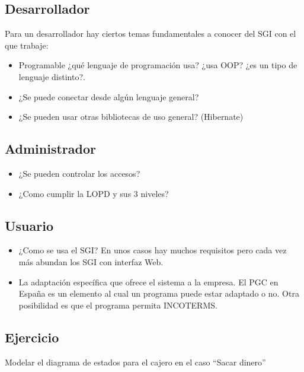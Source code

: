 \documentclass[letterpaper,10pt,spanish]{sphinxmanual}
\begin{document}
\subsection{Desarrollador}
\label{tema8:desarrollador}
Para un desarrollador hay ciertos temas fundamentales a conocer del SGI con el que trabaje:
\begin{itemize}
\item {} 
Programable ¿qué lenguaje de programación usa? ¿usa OOP? ¿es un tipo de lenguaje distinto?.

\item {} 
¿Se puede conectar desde algún lenguaje general?

\item {} 
¿Se pueden usar otras bibliotecas de uso general? (Hibernate)

\end{itemize}


\subsection{Administrador}
\label{tema8:administrador}\begin{itemize}
\item {} 
¿Se pueden controlar  los accesos?

\item {} 
¿Como cumplir la LOPD y sus 3 niveles?

\end{itemize}


\subsection{Usuario}
\label{tema8:usuario}\begin{itemize}
\item {} 
¿Como se usa el SGI? En unos casos hay muchos requisitos pero cada vez más abundan los SGI con interfaz Web.

\item {} 
La adaptación específica que ofrece el sistema a la empresa. El PGC en España es un elemento al cual un programa puede estar adaptado o no. Otra posibilidad es que el programa permita INCOTERMS.

\end{itemize}


\subsection{Ejercicio}
\label{tema8:ejercicio}
Modelar el diagrama de estados para el cajero en el caso ``Sacar dinero''



\renewcommand{\indexname}{Índice}
\printindex
\end{document}

